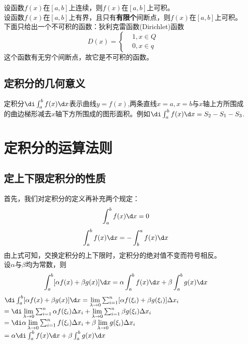 \sj
\theorem[积分存在条件1]
设函数$f(x)$在$[a,b]$上连续，则$f(x)$在$[a,b]$上可积。\\

\theorem[积分存在条件2]
设函数$f(x)$在$[a,b]$上有界，且只有\textbf{有限个}间断点，则$f(x)$在$[a,b]$上可积。
下面只给出一个不可积的函数：狄利克雷函数(Dirichlet)函数
\begin{equation}
	\nonumber
	D(x)=\left\{
		\begin{aligned}
			& 1,x\in Q\\
			& 0,x\in q&
		\end{aligned}
		\right.
\end{equation}
这个函数有无穷个间断点，故它是不可积的函数。
\subsection{定积分的几何意义}
定积分$\di\int_{a}^{b}f(x)\d x$表示曲线$y=f(x)$,两条直线$x=a,x=b$与$x$轴上方所围成的曲边梯形减去$x$轴下方所围成的图形面积。例如$\di\int_{a}^{b}f(x)\d x=S_2-S_1-S_3$.
\section{定积分的运算法则}
\subsection{定上下限定积分的性质}
首先，我们对定积分的定义再补充两个规定：
\begin{equation}
	\int_{a}^{b}f(x)\d x=0
\end{equation}
\begin{equation}
	\int_{a}^{b}f(x)\d x=-\int_{b}^{a}f(x)\d x
\end{equation}
由上式可知，交换定积分的上下限时，定积分的绝对值不变而符号相反。\\

\sj
\theorem[定上下限积分性质1]
设$\alpha$与$\beta$均为常数，则
\begin{equation}
	\int_{a}^{b}[\alpha f(x)+\beta g(x)]\d x=\alpha\int_{a}^{b}f(x)\d x+\beta\int_{a}^{b}g(x)\d x
\end{equation}
\proof $\di\int_{a}^{b}[\alpha f(x)+\beta g(x)]\d x=\lim\limits_{\lambda\to0}\sum_{i=1}^{n}[\alpha f(\xi_i)+\beta g(\xi_i)]\Delta x_i$\vspace{-1em}\\
$=\di\lim\limits_{\lambda\to0}\sum_{i=1}^{n}\alpha f(\xi_i)\Delta x_i+\lim\limits_{\lambda\to0}\sum_{i=1}^{n}\beta g(\xi_i)\Delta x_i$\\
$=\di\alpha\lim\limits_{\lambda\to0}\sum_{i=1}^{n}f(\xi_i)\Delta x_i+\beta\lim\limits_{\lambda\to0}g(\xi_i)\Delta x_i$\\
$=\alpha \di\int_{a}^{b}f(x)\d x+\beta \int_{a}^{b}g(x)\d x$\\

